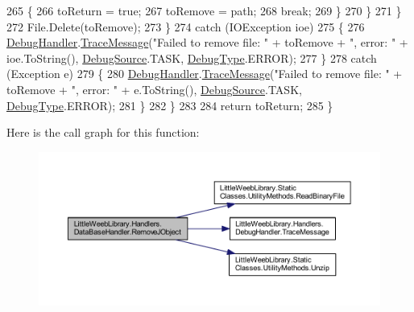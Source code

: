 \begin{DoxyCode}
265                             \{
266                                 toReturn = \textcolor{keyword}{true};
267                                 toRemove = path;
268                                 \textcolor{keywordflow}{break};
269                             \}
270                         \}
271                     \}
272                     File.Delete(toRemove);
273                 \}
274                 \textcolor{keywordflow}{catch} (IOException ioe)
275                 \{
276                     \mbox{\hyperlink{class_little_weeb_library_1_1_handlers_1_1_data_base_handler_aa474a1f934032623ffb3ae5eb156148b}{DebugHandler}}.\mbox{\hyperlink{interface_little_weeb_library_1_1_handlers_1_1_i_debug_handler_a2e405bc3492e683cd3702fae125221bc}{TraceMessage}}(\textcolor{stringliteral}{"Failed to remove file: "} + toRemove 
      + \textcolor{stringliteral}{", error: "} + ioe.ToString(), \mbox{\hyperlink{namespace_little_weeb_library_1_1_handlers_a2a6ca0775121c9c503d58aa254d292be}{DebugSource}}.TASK, \mbox{\hyperlink{namespace_little_weeb_library_1_1_handlers_ab66019ed40462876ec4e61bb3ccb0a62}{DebugType}}.ERROR);
277                 \}
278                 \textcolor{keywordflow}{catch} (Exception e)
279                 \{
280                     \mbox{\hyperlink{class_little_weeb_library_1_1_handlers_1_1_data_base_handler_aa474a1f934032623ffb3ae5eb156148b}{DebugHandler}}.\mbox{\hyperlink{interface_little_weeb_library_1_1_handlers_1_1_i_debug_handler_a2e405bc3492e683cd3702fae125221bc}{TraceMessage}}(\textcolor{stringliteral}{"Failed to remove file: "} + toRemove 
      + \textcolor{stringliteral}{", error: "} + e.ToString(), \mbox{\hyperlink{namespace_little_weeb_library_1_1_handlers_a2a6ca0775121c9c503d58aa254d292be}{DebugSource}}.TASK, \mbox{\hyperlink{namespace_little_weeb_library_1_1_handlers_ab66019ed40462876ec4e61bb3ccb0a62}{DebugType}}.ERROR);
281                 \}
282             \}
283 
284             \textcolor{keywordflow}{return} toReturn;
285         \}
\end{DoxyCode}
Here is the call graph for this function\+:\nopagebreak
\begin{figure}[H]
\begin{center}
\leavevmode
\includegraphics[width=350pt]{class_little_weeb_library_1_1_handlers_1_1_data_base_handler_ac9938b8d47b353d15c8e77e94849896e_cgraph}
\end{center}
\end{figure}
